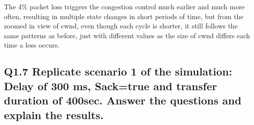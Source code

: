 \documentclass{article}
\begin{document}
The 4\% packet loss triggers the congestion control much earlier and much more often, resulting in multiple state changes in short periods of time, but from the zoomed in view of cwnd, even though each cycle is shorter, it still follows the same patterns as before, just with different values as the size of cwnd differs each time a loss occurs.

\subsection{Q1.7  Replicate scenario 1 of the simulation:  \textbf{Delay of 300 ms, Sack=true and transfer duration of 400sec}. Answer the questions and explain the results.}

\end{document}
